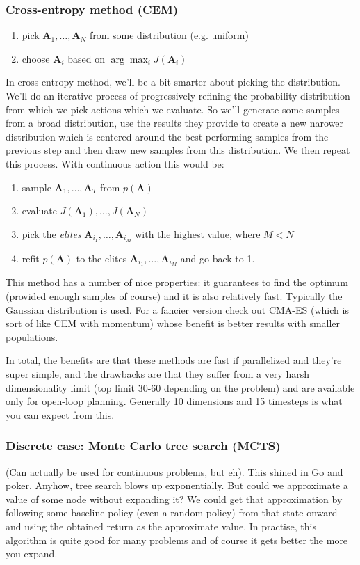 \documentclass{report}
\newcommand{\argmax}{\arg\!\max}
\begin{document}
\subsubsection{Cross-entropy method (CEM)}
\begin{enumerate}
		\item pick $\bm{A}_1, \dots, \bm{A}_N $ \underline{from some distribution} (e.g. uniform)
		\item choose $\bm{A}_i$ based on $\argmax_i J(\bm{A}_i)  $
\end{enumerate}
In cross-entropy method, we'll be a bit smarter about picking the distribution.
We'll do an iterative process of progressively refining the probability distribution from which we pick actions 
which we evaluate.
So we'll generate some samples from a broad distribution, use the results they provide to 
create a new narower distribution which is centered around the best-performing samples from the previous step
and then draw new samples from this distribution. We then repeat this process.
With continuous action this would be:
\begin{enumerate}
		\item sample $\bm{A}_1, \dots, \bm{A}_T $ from $p(\bm{A})$
		\item evaluate $J(\bm{A}_1), \dots, J(\bm{A}_N)$
		\item pick the \textit{elites} $\bm{A}_{i_1}, \dots, \bm{A}_{i_M} $ with the highest value, where $M < N$
		\item refit $p(\bm{A})$ to the elites $\bm{A}_{i_1}, \dots, \bm{A}_{i_M} $ and go back to 1.
\end{enumerate}
This method has a number of nice properties: it guarantees to find the optimum (provided enough samples of course)
and it is also relatively fast.
Typically the Gaussian distribution is used.
For a fancier version check out CMA-ES (which is sort of like CEM with momentum) whose benefit 
is better results with smaller populations.

In total, the benefits are that these methods are fast if parallelized and they're super simple, 
and the drawbacks are that they suffer from a very harsh dimensionality limit (top limit 30-60 depending on the problem)
and are available only for open-loop planning. Generally 10 dimensions and 15 timesteps is what you can expect from this.

\subsubsection{Discrete case: Monte Carlo tree search (MCTS)}
(Can actually be used for continuous problems, but eh).
This shined in Go and poker.
Anyhow, tree search blows up exponentially.
But could we approximate a value of some node without expanding it?
We could get that approximation by following some baseline policy (even a random policy) from that state onward 
and using the obtained return as the approximate value.
In practise, this algorithm is quite good for many problems and of course it gets better the more you expand.
\end{document}
